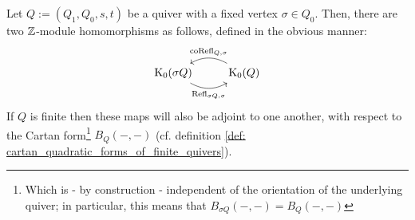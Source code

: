             \begin{remark} \label{remark: (co)reflection_functors_and_grothendieck_groups}
                Let $Q := (Q_1, Q_0, s, t)$ be a quiver with a fixed vertex $\sigma \in Q_0$. Then, there are two $\mathbb{Z}$-module homomorphisms as follows, defined in the obvious manner:
                    $$
                        \begin{tikzcd}
                        	{\K_0(\sigma Q)} & {\K_0(Q)}
                        	\arrow[""{name=0, anchor=center, inner sep=0}, "{\Refl_{\sigma Q, \sigma}}"', bend right, from=1-1, to=1-2]
                        	\arrow[""{name=1, anchor=center, inner sep=0}, "{\co\Refl_{Q, \sigma}}"', bend right, from=1-2, to=1-1]
                        \end{tikzcd}
                    $$
                If $Q$ is finite then these maps will also be adjoint to one another, with respect to the Cartan form\footnote{Which is - by construction - independent of the orientation of the underlying quiver; in particular, this means that $B_{\sigma Q}(-, -) = B_Q(-, -)$} $B_Q(-, -)$ (cf. definition \ref{def: cartan_quadratic_forms_of_finite_quivers}).
            \end{remark}
            
